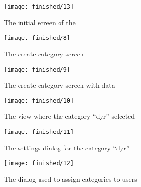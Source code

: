 \begin{figure}[!htbp]
	\centering
	\texttt{[image: finished/13]}
	\caption{The initial screen of the \ct}
\end{figure}
\FloatBarrier

\begin{figure}[!htbp]
	\centering
	\texttt{[image: finished/8]}
	\caption{The create category screen}
\end{figure}
\FloatBarrier

\begin{figure}[!htbp]
	\centering
	\texttt{[image: finished/9]}
	\caption{The create category screen with data}
\end{figure}
\FloatBarrier

\begin{figure}[!htbp]
	\centering
	\texttt{[image: finished/10]}
	\caption{The view where the category ``dyr'' selected}
\end{figure}
\FloatBarrier

\begin{figure}[!htbp]
	\centering
	\texttt{[image: finished/11]}
	\caption{The settings-dialog for the category ``dyr''}
\end{figure}
\FloatBarrier

\begin{figure}[!htbp]
	\centering
	\texttt{[image: finished/12]}
	\caption{The dialog used to assign categories to users}
\end{figure}
\FloatBarrier